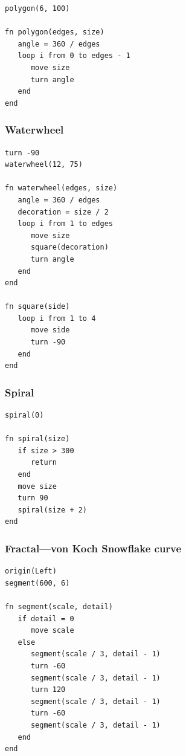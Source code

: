 \documentclass[12pt,a4paper,twoside]{article}
\renewcommand{\_}{\texttt{\symbol{95}}}
\begin{document}
\begin{verbatim}
polygon(6, 100)

fn polygon(edges, size)
   angle = 360 / edges
   loop i from 0 to edges - 1
      move size
      turn angle
   end
end
\end{verbatim}

\subsubsection*{Waterwheel}

\begin{verbatim}
turn -90
waterwheel(12, 75)

fn waterwheel(edges, size)
   angle = 360 / edges
   decoration = size / 2
   loop i from 1 to edges
      move size
      square(decoration)
      turn angle
   end
end

fn square(side)
   loop i from 1 to 4
      move side
      turn -90
   end
end
\end{verbatim}

\subsubsection*{Spiral}

\begin{verbatim}
spiral(0)

fn spiral(size)
   if size > 300
      return
   end
   move size
   turn 90
   spiral(size + 2)
end
\end{verbatim}

\subsubsection*{Fractal---von Koch Snowflake curve}

\begin{verbatim}
origin(Left)
segment(600, 6)

fn segment(scale, detail)
   if detail = 0
      move scale
   else
      segment(scale / 3, detail - 1)
      turn -60
      segment(scale / 3, detail - 1)
      turn 120
      segment(scale / 3, detail - 1)
      turn -60
      segment(scale / 3, detail - 1)
   end
end
\end{verbatim}
\end{document}
